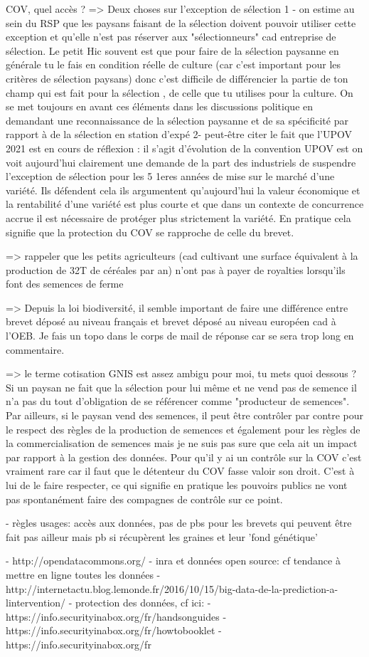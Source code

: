 COV, quel accès ?
=> Deux choses sur l'exception de sélection 
1 - on estime au sein du RSP que les paysans faisant de la sélection doivent pouvoir utiliser cette exception et qu'elle n'est pas réserver aux "sélectionneurs" cad entreprise de sélection. Le petit Hic souvent est que pour faire de la sélection paysanne en générale tu le fais en condition réelle de culture (car c'est important pour les critères de sélection paysans) donc c'est difficile de différencier la partie de ton champ qui est fait pour la sélection , de celle que tu utilises pour la culture. On se met toujours en avant ces éléments dans les discussions politique en demandant une reconnaissance de la sélection paysanne et de sa spécificité par rapport à de la sélection en station d'expé
2- peut-être citer le fait que l'UPOV 2021 est en cours de réflexion : il s'agit d'évolution de la convention UPOV est on voit aujourd'hui clairement une demande de la part des industriels de suspendre l'exception de sélection pour les 5 1eres années de mise sur le marché d'une variété. Ils défendent cela ils argumentent qu'aujourd'hui la valeur économique et la rentabilité d'une variété est plus courte et que dans un contexte de concurrence accrue il est nécessaire de protéger plus strictement la variété. En pratique cela signifie que la protection du COV se rapproche de celle du brevet.

=> rappeler que les petits agriculteurs (cad cultivant une surface équivalent à la production de 32T de céréales par an) n'ont pas à payer de royalties lorsqu'ils font des semences de ferme

=> Depuis la loi biodiversité, il semble important de faire une différence entre brevet déposé au niveau français et brevet déposé au niveau européen cad à l'OEB. Je fais un topo dans le corps de mail de réponse car se sera trop long en commentaire.

=> le terme cotisation GNIS est assez ambigu pour moi, tu mets quoi dessous ?
Si un paysan ne fait que la sélection pour lui même et ne vend pas de semence il n'a pas du tout d'obligation de se référencer comme "producteur de semences". 
Par ailleurs, si le paysan vend des semences, il peut être contrôler par contre pour le respect des règles de la production de semences et également pour les règles de la commercialisation de semences mais je ne suis pas sure que cela ait un impact par rapport à la gestion des données. 
Pour qu'il y ai un contrôle sur la COV c'est vraiment rare car il faut que le détenteur du COV fasse valoir son droit. C'est à lui de le faire respecter, ce qui signifie en pratique les pouvoirs publics ne vont pas spontanément faire des compagnes de contrôle sur ce point.

- règles usages: accès aux données, pas de pbs pour les brevets qui peuvent être fait pas ailleur mais pb si récupèrent les graines et 
leur 'fond génétique'

- http://opendatacommons.org/
- inra et données open source: cf tendance à mettre en ligne toutes les données
- http://internetactu.blog.lemonde.fr/2016/10/15/big-data-de-la-prediction-a-lintervention/
- protection des données, cf ici:
	- https://info.securityinabox.org/fr/handsonguides
	- https://info.securityinabox.org/fr/howtobooklet
	- https://info.securityinabox.org/fr

